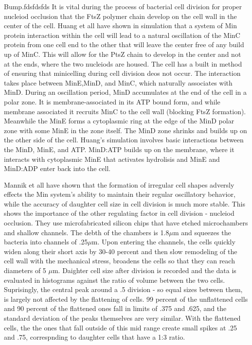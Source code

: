 \documentclass[pdftex,10pt,a4paper]{article}
\begin{document}


Bump.fdsfdsfds
It is vital during the process of bacterial cell division for proper nucleiod occlusion that the FtsZ polymer chain develop on the cell wall in the center of the cell.  Huang et all have shown in simulation that a system of Min protein interaction within the cell will lead to a natural oscillation of the MinC protein from one cell end to the other that will leave the center free of any build up of MinC.  This will allow for the PtsZ chain to develop in the center and not at the ends, where the two nucleiods are housed.  The cell has a built in method of ensuring that minicelling during cell division deos not occur.  The interaction takes place between MinE,MinD, and MinC, which naturally associates with MinD.  During an oscillation period, MinD accumulates at the end of the cell in a polar zone.  It is membrane-associated in its ATP bound form, and while membrane associated it recruits MinC to the cell wall (blocking FtsZ formation).  Meanwhile the MinE forms a cytoplasmic ring at the edge of the MinD polar zone with some MinE in the zone itself.  The MinD zone shrinks and builds up on the other side of the cell.  Huang's simulation involves basic interactions between the MinD, MinE, and ATP.  MinD:ATP builds up on the membrane, where it interacts with cytoplasmic MinE that activates hydrolisis and MinE and MinD:ADP enter back into the cell.

Mannik et all have shown that the formation of irregular cell shapes adversly effects the Min system's ability to maintain their regular oscillatory behavior, while the accuracy of daughter cell size in cell division is much more stable.  This shows the importance of the other regulating factor in cell division - nucleiod occlusion.  They use microfabricated silicon chips that have etched microchambers and shallow channels.  The debth of the chambers is 1.8$\mu$m and squeezes the bacteria into channels of .25$\mu$m.  Upon entering the channels, the cells quickly widen along their short axis by 30-40 percent and then slow remodeling of the cell wall with the mechanical stress, broadens the cells so that they can reach diameters of 5 $\mu$m.  Daighter cell size after division is recorded and the data is evaluated in histograms against the ratio of volume between the two cells.  Suprisingly, the central peak around a .5 division - so equal sizes between them, is largely not affected by the flattening of cells.  99 percent of the unflattened cells and 90 percent of the flattened ones fall in limits of .375 and .625, and the standard deviation of the peaks themselves are very similar.  With the flattened cells, the the ones that fall outside of this mid range create small spikes at .25 and .75, correspnding to daughter cells that have a 1:3 ratio.
\end{document}
